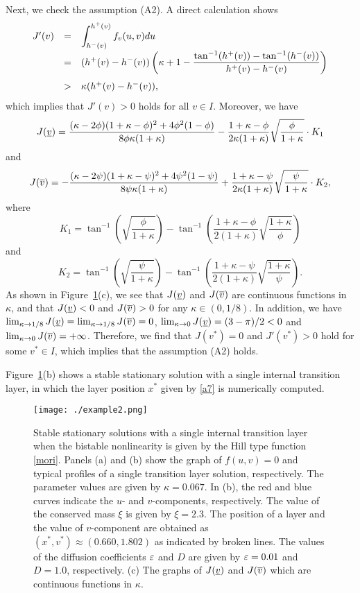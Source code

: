 \documentclass[a4,10pt]{article}
\begin{document}
Next, we check the assumption (A2). A direct calculation shows
%
$$
\begin{array}{rcl}
J'(v) & = &
\displaystyle{ \int_{h^-(v)}^{h^+(v)} f_v(u, v)du  } 
\\[2ex]
& = &
\displaystyle{(h^+(v) - h^-(v)) 
\left( \kappa + 1 - \frac{\tan^{-1} (h^+(v)) - \tan^{-1} (h^-(v)) } {h^+(v) - h^-(v)} \right) }  
\\[3ex]
 & > &  \kappa (h^+(v) - h^-(v)),
\end{array}
$$
%
which implies that $J'(v) > 0$ holds for all $v \in I$. Moreover, we have 
%
$$
J (\underline{v})  =  
\frac{(\kappa - 2 \phi)(1 + \kappa - \phi)^2 + 4 \phi^2 (1 - \phi) }{8 \phi \kappa (1 + \kappa) }
- \frac{1 + \kappa - \phi}{2 \kappa (1 + \kappa)} \sqrt{ \frac{\phi}{1 + \kappa}  }
\cdot K_1
$$
and 
$$ 
J (\overline{v})  =  
- \frac{(\kappa - 2 \psi)(1 + \kappa - \psi)^2 + 4 \psi^2 (1 - \psi) }{8 \psi \kappa (1 + \kappa) } 
  +   \frac{1 + \kappa - \psi}{2 \kappa (1 + \kappa)} \sqrt{ \frac{\psi}{1 + \kappa}  }
\cdot K_2,
$$
%
where
%
$$
K_1 = 
\tan^{-1} \left(  \sqrt{ \frac{\phi}{1 + \kappa} } \right) - 
\tan^{-1} \left(  \frac{1 + \kappa - \phi}{2 (1 + \kappa) }  \sqrt{ \frac{1 + \kappa}{\phi} } \right)   
$$
%
and
%
$$ 
K_2 = 
\tan^{-1} \left(  \sqrt{ \frac{\psi}{1 + \kappa} }  \right) -
\tan^{-1} \left(  \frac{1 + \kappa - \psi}{2 (1 + \kappa) }  \sqrt{ \frac{1 + \kappa}{\psi} } \right). 
$$
%
As shown in Figure~\ref{example2}(c), we see that 
$J (\underline{v})$ and $J (\overline{v})$ are continuous functions 
in $\kappa$, and that
$J (\underline{v}) < 0$ and $J (\overline{v}) > 0$ for any $\kappa \in (0, 1/8)$.
In addition, we have
$\lim_{\kappa \to 1/8} J (\underline{v}) =  \lim_{\kappa \to 1/8} J (\overline{v}) = 0$, 
$\lim_{\kappa \to 0} J (\underline{v}) = (3 - \pi)/2 < 0 $ and $\lim_{\kappa \to 0} J (\overline{v}) = + \infty$. 
Therefore, we find that $J(v^*) = 0$ and $J'(v^*) > 0$ hold for some $v^* \in I$, which implies
that the assumption (A2) holds.

Figure~\ref{example2}(b) shows a stable stationary solution with a single internal 
transition layer, in which 
the layer position $x^*$ given by \eqref{a7} is numerically computed.

%
\begin{figure}[ht!]
 \centering
\texttt{[image: ./example2.png]}
  \caption {Stable stationary solutions with a single internal transition layer when
the bistable nonlinearity is given by the Hill type function \eqref{mori}. 
    Panels (a) and (b) show the graph of $f(u,v) =0$ and typical profiles 
 of a single transition layer solution, respectively. The parameter values are given by $\kappa = 0.067$. In (b), the red and blue curves indicate the $u$- and $v$-components, respectively. The value of the conserved mass $\xi$ is given by $\xi = 2.3$.
 The position of a layer and the value of $v$-component are obtained 
as $(x^*, v^*) \approx (0.660, 1.802)$ as indicated by broken lines. The values of the diffusion coefficients $\varepsilon$ and $D$ are given by $\varepsilon = 0.01$ and $D=1.0$, respectively. 
 (c) The graphs of $J (\underline{v})$ and $J (\overline{v})$ which are continuous
functions in $\kappa$.  
  }
  \label{example2}
\end{figure}
 
\end{document}
